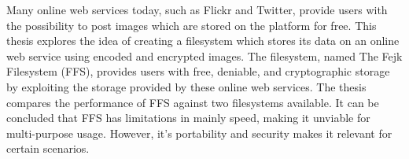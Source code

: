 




Many online web services today, such as Flickr and Twitter, provide users with the possibility to post images which are stored on the platform for free. This thesis explores the idea of creating a filesystem which stores its data on an online web service using encoded and encrypted images. The filesystem, named The Fejk Filesystem (FFS), provides users with free, deniable, and cryptographic storage by exploiting the storage provided by these online web services. The thesis compares the performance of FFS against two filesystems available. It can be concluded that FFS has limitations in mainly speed, making it unviable for multi-purpose usage. However, it's portability and security makes it relevant for certain scenarios.

